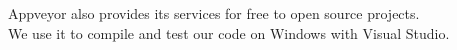 Appveyor also provides its services for free to open source projects. \cite{appveyorpricing} \\
We use it to compile and test our code on Windows with Visual Studio.

